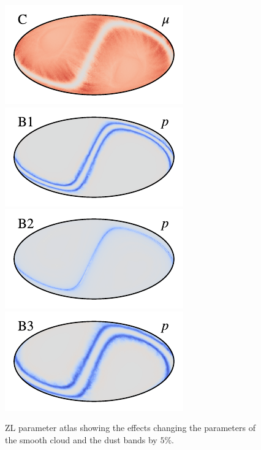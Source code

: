 \documentclass{aa}
\begin{document}
\begin{figure}
    \includegraphics[width=.23\textwidth]{figs/atlas/C_10.pdf}
    \includegraphics[width=.23\textwidth]{figs/atlas/B1_10.pdf}
    \includegraphics[width=.23\textwidth]{figs/atlas/B2_10.pdf}
    \includegraphics[width=.23\textwidth]{figs/atlas/B3_10.pdf}\\
   
    \caption{ZL parameter atlas showing the effects changing the parameters of the smooth cloud and the dust bands by $5\%$.}
    \label{fig:atlas1}
\end{figure}
\end{document}

